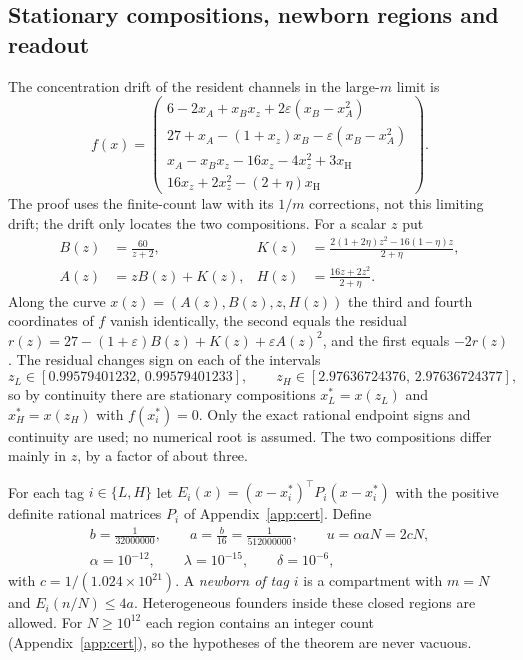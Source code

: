 \documentclass[11pt,a4paper]{article}
\theoremstyle{plain}
\theoremstyle{definition}
\theoremstyle{remark}
\newcommand{\eps}{\varepsilon}
\newcommand{\Hs}{\mathrm H}
\begin{document}
\subsection{Stationary compositions, newborn regions and readout}\label{sec:source}
The concentration drift of the resident channels in the large-$m$ limit is
\begin{equation}\label{eq:drift}
f(x)=\begin{pmatrix}
6-2x_A+x_Bx_z+2\eps(x_B-x_A^2)\\
27+x_A-(1+x_z)x_B-\eps(x_B-x_A^2)\\
x_A-x_Bx_z-16x_z-4x_z^2+3x_\Hs\\
16x_z+2x_z^2-(2+\eta)x_\Hs
\end{pmatrix}.
\end{equation}
The proof uses the finite-count law with its $1/m$ corrections, not this limiting drift; the drift only locates the two compositions. For a scalar $z$ put
\begin{align*}
B(z)&=\frac{60}{z+2},& K(z)&=\frac{2(1+2\eta)z^2-16(1-\eta)z}{2+\eta},\\
A(z)&=zB(z)+K(z),& H(z)&=\frac{16z+2z^2}{2+\eta}.
\end{align*}
Along the curve $x(z)=(A(z),B(z),z,H(z))$ the third and fourth coordinates of $f$ vanish identically, the second equals the residual $r(z)=27-(1+\eps)B(z)+K(z)+\eps A(z)^2$, and the first equals $-2r(z)$. The residual changes sign on each of the intervals
\begin{equation}\label{eq:roots}
z_L\in[0.99579401232,\,0.99579401233],\qquad z_H\in[2.97636724376,\,2.97636724377],
\end{equation}
so by continuity there are stationary compositions $x_L^*=x(z_L)$ and $x_H^*=x(z_H)$ with $f(x_i^*)=0$. Only the exact rational endpoint signs and continuity are used; no numerical root is assumed. The two compositions differ mainly in $z$, by a factor of about three.

For each tag $i\in\{L,H\}$ let $E_i(x)=(x-x_i^*)^{\!\top}P_i(x-x_i^*)$ with the positive definite rational matrices $P_i$ of Appendix~\ref{app:cert}. Define
\begin{equation}\label{eq:constants}
\begin{gathered}
b=\frac1{32000000},\qquad a=\frac b{16}=\frac1{512000000},\qquad u=\alpha aN=2cN,\\
\alpha=10^{-12},\qquad \lambda=10^{-15},\qquad \delta=10^{-6},
\end{gathered}
\end{equation}
with $c=1/(1.024\times10^{21})$. A \emph{newborn of tag $i$} is a compartment with $m=N$ and $E_i(n/N)\leq4a$. Heterogeneous founders inside these closed regions are allowed. For $N\geq10^{12}$ each region contains an integer count (Appendix~\ref{app:cert}), so the hypotheses of the theorem are never vacuous.
\end{document}
